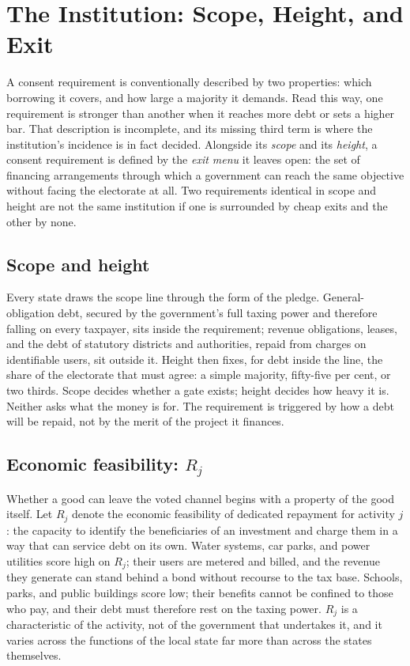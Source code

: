 \section{The Institution: Scope, Height, and Exit}

A consent requirement is conventionally described by two properties: which
borrowing it covers, and how large a majority it demands. Read this way, one
requirement is stronger than another when it reaches more debt or sets a higher
bar. That description is incomplete, and its missing third term is where the
institution's incidence is in fact decided. Alongside its \emph{scope} and its
\emph{height}, a consent requirement is defined by the \emph{exit menu} it
leaves open: the set of financing arrangements through which a government can
reach the same objective without facing the electorate at all. Two requirements
identical in scope and height are not the same institution if one is surrounded
by cheap exits and the other by none.

\subsection{Scope and height}

Every state draws the scope line through the form of the pledge.
General-obligation debt, secured by the government's full taxing power and
therefore falling on every taxpayer, sits inside the requirement; revenue
obligations, leases, and the debt of statutory districts and authorities,
repaid from charges on identifiable users, sit outside it. Height then fixes,
for debt inside the line, the share of the electorate that must agree: a simple
majority, fifty-five per cent, or two thirds. Scope decides whether a gate
exists; height decides how heavy it is. Neither asks what the money is for. The
requirement is triggered by how a debt will be repaid, not by the merit of the
project it finances.

\subsection{Economic feasibility: $R_j$}

Whether a good can leave the voted channel begins with a property of the good
itself. Let $R_j$ denote the economic feasibility of dedicated repayment for
activity $j$: the capacity to identify the beneficiaries of an investment and
charge them in a way that can service debt on its own. Water systems, car
parks, and power utilities score high on $R_j$; their users are metered and
billed, and the revenue they generate can stand behind a bond without recourse
to the tax base. Schools, parks, and public buildings score low; their benefits
cannot be confined to those who pay, and their debt must therefore rest on the
taxing power. $R_j$ is a characteristic of the activity, not of the government
that undertakes it, and it varies across the functions of the local state far
more than across the states themselves.

